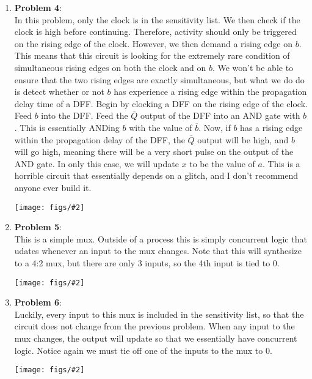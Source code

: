 \documentclass{article}
\newcommand{\fig}[2]{
    \begin{center}
        \texttt{[image: figs/\#2]}
    \end{center}
}
\begin{document}
\begin{enumerate}
        \item \textbf{Problem 4}: \\
            In this problem, only the clock is in the sensitivity list. We then
            check if the clock is high before continuing. Therefore, activity
            should only be triggered on the rising edge of the clock. However,
            we then demand a rising edge on $b$. This means that this circuit is
            looking for the extremely rare condition of simultaneous rising
            edges on both the clock and on $b$. We won't be able to ensure that
            the two rising edges are exactly simultaneous, but what we do do is
            detect whether or not $b$ has experience a rising edge within the
            propagation delay time of a DFF. Begin by clocking a DFF on the
            rising edge of the clock. Feed $b$ into the DFF. Feed the
            $\overline{Q}$ output of the DFF into an AND gate with $b$. This
            is essentially ANDing $b$ with the value of $\overline{b}$. Now, if
            $b$ has a rising edge within the propagation delay of the DFF, the
            $\overline{Q}$ output will be high, and $b$ will go high, meaning
            there will be a very short pulse on the output of the AND gate.
            In only this case, we will update $x$ to be the value of $a$. This
            is a horrible circuit that essentially depends on a glitch, and I
            don't recommend anyone ever build it.
            \fig{.5}{p4.jpg}
        \pagebreak

        \item \textbf{Problem 5}: \\
            This is a simple mux. Outside of a process this is simply concurrent
            logic that udates whenever an input to the mux changes. Note that
            this will synthesize to a 4:2 mux, but there are only 3 inputs, so
            the 4th input is tied to 0.
            \fig{.5}{p5.jpg}

        \item \textbf{Problem 6}: \\
            Luckily, every input to this mux is included in the sensitivity
            list, so that the circuit does not change from the previous problem.
            When any input to the mux changes, the output will update so that we
            essentially have concurrent logic. Notice again we must tie off one
            of the inputs to the mux to 0.
            \fig{.5}{p5.jpg}
        \pagebreak


\end{enumerate}
\end{document}
